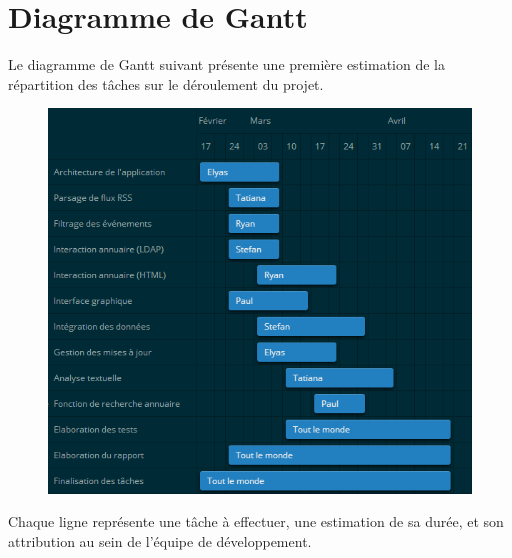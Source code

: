 \newpage

\section{Diagramme de Gantt}
Le diagramme de Gantt suivant présente une première estimation de la répartition des tâches sur le déroulement du projet. 

\begin{figure}[h]
  \center
  \includegraphics[width=1.0\textwidth]{resources/gantt.png}
\end{figure}

Chaque ligne représente une tâche à effectuer, une estimation de sa durée, et son attribution au sein de l'équipe de développement. \\